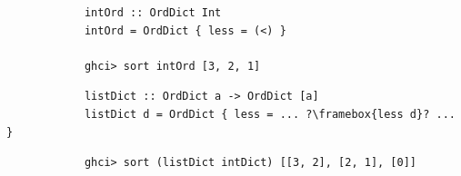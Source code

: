     \begin{frame}[fragile]{}
        \pause
        \begin{verbatim}
            intOrd :: OrdDict Int
            intOrd = OrdDict { less = (<) }

            ghci> sort intOrd [3, 2, 1]
        \end{verbatim}
        \pause\vspace{1em}
        \begin{verbatim}
            listDict :: OrdDict a -> OrdDict [a]
            listDict d = OrdDict { less = ... ?\framebox{less d}? ... }
        \end{verbatim}
        \pause\vspace{1em}
        \begin{verbatim}
            ghci> sort (listDict intDict) [[3, 2], [2, 1], [0]]
        \end{verbatim}
    \end{frame}

